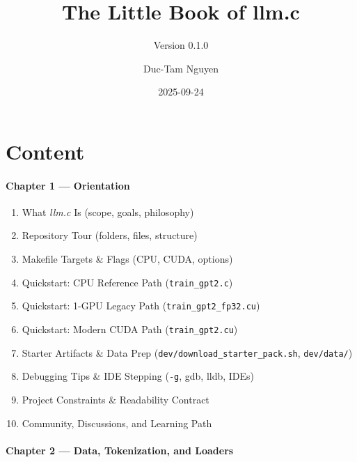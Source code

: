 \documentclass[
  letterpaper,
  DIV=11,
  numbers=noendperiod]{scrreprt}
\title{The Little Book of llm.c}
\subtitle{Version 0.1.0}
\author{Duc-Tam Nguyen}
\date{2025-09-24}
\providecommand{\tightlist}{%
  \setlength{\itemsep}{0pt}\setlength{\parskip}{0pt}}
\renewcommand*\contentsname{Table of contents}
\newcommand\contentsname{Table of contents}
\begin{document}
\maketitle

\renewcommand*\contentsname{Table of contents}
{
\hypersetup{linkcolor=}
\setcounter{tocdepth}{2}
\tableofcontents
}


\chapter{Content}\label{content}

\subsubsection{Chapter 1 --- Orientation}\label{chapter-1-orientation}

\begin{enumerate}
\def\labelenumi{\arabic{enumi}.}
\tightlist
\item
  What \emph{llm.c} Is (scope, goals, philosophy)
\item
  Repository Tour (folders, files, structure)
\item
  Makefile Targets \& Flags (CPU, CUDA, options)
\item
  Quickstart: CPU Reference Path (\texttt{train\_gpt2.c})
\item
  Quickstart: 1-GPU Legacy Path (\texttt{train\_gpt2\_fp32.cu})
\item
  Quickstart: Modern CUDA Path (\texttt{train\_gpt2.cu})
\item
  Starter Artifacts \& Data Prep
  (\texttt{dev/download\_starter\_pack.sh}, \texttt{dev/data/})
\item
  Debugging Tips \& IDE Stepping (\texttt{-g}, gdb, lldb, IDEs)
\item
  Project Constraints \& Readability Contract
\item
  Community, Discussions, and Learning Path
\end{enumerate}

\subsubsection{Chapter 2 --- Data, Tokenization, and
Loaders}\label{chapter-2-data-tokenization-and-loaders}
\end{document}
